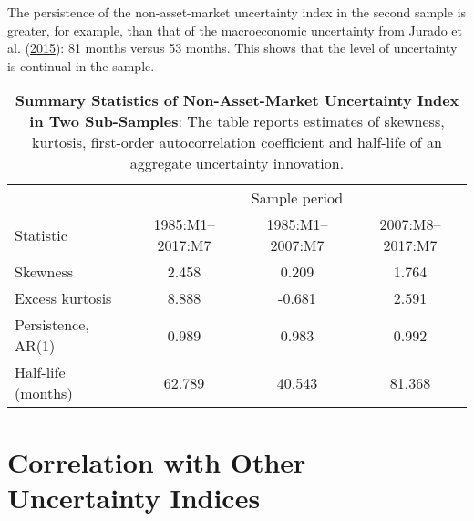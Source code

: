 \documentclass[12pt,twoside]{reedthesis}
\begin{document}
The persistence of the non-asset-market uncertainty index in the second sample is greater, for example, than that of the macroeconomic uncertainty from Jurado et al. (\protect\hyperlink{ref-juraetal:2015}{2015}): 81 months versus 53 months. This shows that the level of uncertainty is continual in the sample.


\begin{table}[t]

\caption[Summary Statistics of Non-Asset-Market Uncertainty Index in Two Sub-Samples]{\label{tab:summary-table}\textbf{Summary Statistics of Non-Asset-Market Uncertainty Index in Two Sub-Samples}: The table reports estimates of skewness, kurtosis, first-order autocorrelation coefficient and half-life of an aggregate uncertainty innovation.}
\centering
\begin{tabular}{lccc}
\toprule
\multicolumn{1}{c}{} & \multicolumn{3}{c}{Sample period} \\
\cmidrule(l{3pt}r{3pt}){2-4}
Statistic & 1985:M1--2017:M7 & 1985:M1--2007:M7 & 2007:M8--2017:M7\\
\midrule
Skewness & 2.458 & 0.209 & 1.764\\
Excess kurtosis & 8.888 & -0.681 & 2.591\\
Persistence, AR(1) & 0.989 & 0.983 & 0.992\\
Half-life (months) & 62.789 & 40.543 & 81.368\\
\bottomrule
\end{tabular}
\end{table}
\hypertarget{correlation-with-uncertainty-indices}{%
\section{Correlation with Other Uncertainty Indices}\label{correlation-with-uncertainty-indices}}
\end{document}
